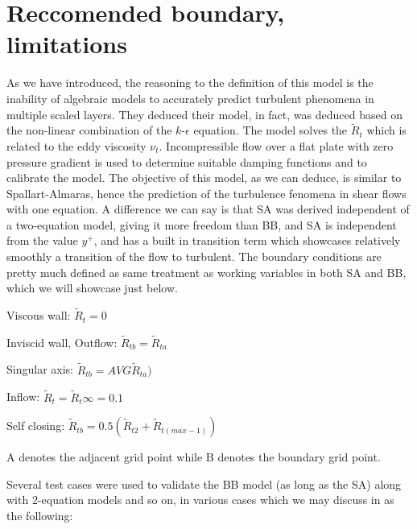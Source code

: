 \documentclass{article}
\begin{document}
\section{Reccomended boundary, limitations}
As we have introduced, the reasoning to the definition of this model is the inability of algebraic models to accurately predict turbulent phenomena in multiple scaled layers. They deduced their model, in fact, was deduced based on the non-linear combination of the $k$-$\epsilon$ equation. The model solves the $\widetilde{R}_t$ which is related to the eddy viscosity ${\nu_t}$. Incompressible flow over a flat plate with zero pressure gradient is used to determine suitable damping functions and to calibrate the model. The objective of this model, as we can deduce, is similar to Spallart-Almaras, hence the prediction of the turbulence fenomena in shear flows with one equation. A difference we can say is that SA was derived independent of a two-equation model, giving it more freedom than BB, and SA is independent from the value $y^+$, and has a built in transition term which showcases relatively smoothly a transition of the flow to turbulent.
The boundary conditions are pretty much defined as same treatment as working variables in both SA and BB, which we will showcase just below.

\bigskip
\begin{center}
Viscous wall: ${\widetilde{R}_t}=0$
\end{center}
\bigskip
\begin{center}
    Inviscid wall, Outflow: ${\widetilde{R}_{tb}}={\widetilde{R}_{ta}}$
\end{center}
\bigskip
\begin{center}
    Singular axis: ${\widetilde{R}_{tb}}={AVG}{\widetilde{R}_{ta}})$
\end{center}
\bigskip
\begin{center}
    Inflow: ${\widetilde{R}_{t}}={\widetilde{R}_{t}}{\infty}=0.1$
\end{center}
\bigskip
\begin{center}
    Self closing: ${\widetilde{R}_{tb}}={0.5}({\widetilde{R}_{t2}}+{{\widetilde{R}_{t(max-1)}}})$
\end{center}
\bigskip
A denotes the adjacent grid point while B denotes the boundary grid point.

\newpage
Several test cases were used to validate the BB model (as long as the SA) along with 2-equation models and so on, in various cases which we may discuss in as the following:
\end{document}
